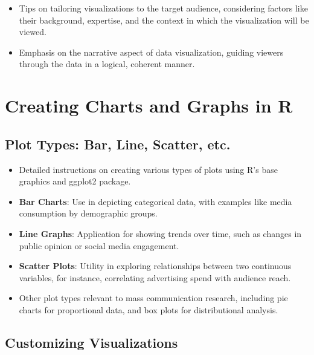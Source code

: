 \documentclass[
]{book}
\begin{document}
\begin{itemize}
\item
  Tips on tailoring visualizations to the target audience, considering factors like their background, expertise, and the context in which the visualization will be viewed.
\item
  Emphasis on the narrative aspect of data visualization, guiding viewers through the data in a logical, coherent manner.
\end{itemize}

\hypertarget{creating-charts-and-graphs-in-r}{%
\section*{Creating Charts and Graphs in R}\label{creating-charts-and-graphs-in-r}}

\hypertarget{plot-types-bar-line-scatter-etc.}{%
\subsection*{Plot Types: Bar, Line, Scatter, etc.}\label{plot-types-bar-line-scatter-etc.}}

\begin{itemize}
\item
  Detailed instructions on creating various types of plots using R's base graphics and ggplot2 package.
\item
  \textbf{Bar Charts}: Use in depicting categorical data, with examples like media consumption by demographic groups.
\item
  \textbf{Line Graphs}: Application for showing trends over time, such as changes in public opinion or social media engagement.
\item
  \textbf{Scatter Plots}: Utility in exploring relationships between two continuous variables, for instance, correlating advertising spend with audience reach.
\item
  Other plot types relevant to mass communication research, including pie charts for proportional data, and box plots for distributional analysis.
\end{itemize}

\hypertarget{customizing-visualizations}{%
\subsection*{Customizing Visualizations}\label{customizing-visualizations}}
\end{document}
